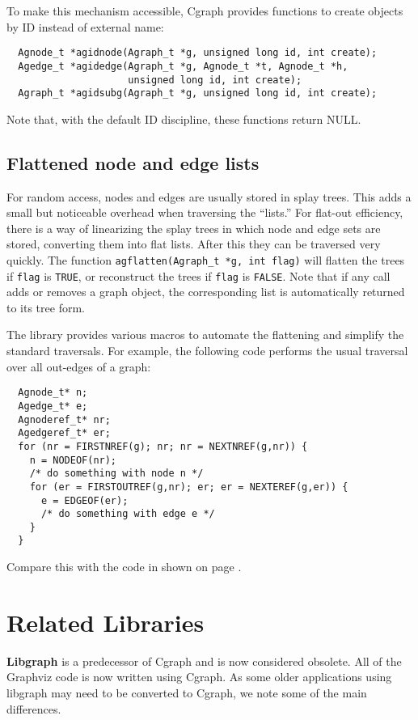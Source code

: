 \documentclass[11pt,letterpaper]{article}
\begin{document}
To make this mechanism accessible, Cgraph provides functions
to create objects by ID instead of external name:
\begin{verbatim}
  Agnode_t *agidnode(Agraph_t *g, unsigned long id, int create);
  Agedge_t *agidedge(Agraph_t *g, Agnode_t *t, Agnode_t *h, 
                     unsigned long id, int create);
  Agraph_t *agidsubg(Agraph_t *g, unsigned long id, int create);
\end{verbatim}
Note that, with the default ID discipline, these functions return NULL.

\subsection{Flattened node and edge lists}
For random access, nodes and edges are usually stored in splay trees. 
This adds a small but noticeable overhead when traversing the ``lists.''
For flat-out efficiency,
there is a way of linearizing the splay trees in which node
and edge sets are stored, converting them into flat lists.  After
this they can be traversed very quickly. The function
\verb"agflatten(Agraph_t *g, int flag)" 
will flatten the trees if \verb"flag" is \verb"TRUE",
or reconstruct the trees if \verb"flag" is \verb"FALSE".
Note that if any call adds or removes a graph object, the corresponding list
is automatically returned to its tree form.

The library provides various macros to automate the flattening and simplify
the standard traversals. For example, the following code performs the usual
traversal over all out-edges of a graph:
\begin{verbatim}
  Agnode_t* n;
  Agedge_t* e;
  Agnoderef_t* nr;
  Agedgeref_t* er;
  for (nr = FIRSTNREF(g); nr; nr = NEXTNREF(g,nr)) {
    n = NODEOF(nr);
    /* do something with node n */
    for (er = FIRSTOUTREF(g,nr); er; er = NEXTEREF(g,er)) {
      e = EDGEOF(er);
      /* do something with edge e */
    }
  }
\end{verbatim}
Compare this with the code in shown on page \pageref{traversal}. 

\section{Related Libraries}
\label{sec:relatedlibraries}
{\bf Libgraph} is a predecessor of Cgraph and is now considered
obsolete. All of the Graphviz code is now written using Cgraph.
As some older applications using libgraph
may need to be converted to Cgraph, we note some of the main
differences.
\end{document}
